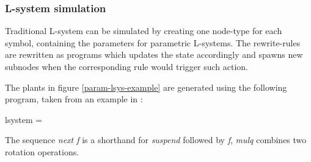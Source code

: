 \subsubsection{L-system simulation}


\label{lsystem_to_dsel}

    Traditional L-system can be simulated by creating one node-type
    for each symbol, containing the parameters for parametric
    L-systems. The rewrite-rules are rewritten as programs which
    updates the state accordingly and spawns new subnodes when
    the corresponding rule would trigger such action.
    
    The plants in figure \ref{param-lsys-example} are generated using 
    the following program, taken from an example in
    \cite{lsys_theory_vis}:

\newpage
\begin{haskell*}
lsystem = 
\end{haskell*}
    The sequence \emph{next f} is a shorthand for \emph{suspend} followed by
    \emph{f}, \emph{mulq} combines two rotation operations.

